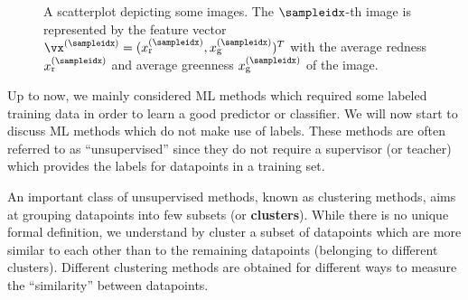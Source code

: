 \documentclass[12pt]{report}
\begin{document}
\begin{figure}[htbp]
\begin{center}
\end{center}
\caption{A scatterplot depicting some images. The $\sampleidx$-th image is 
	represented by the feature vector $\vx^{(\sampleidx)}=(x^{(\sampleidx)}_{\rm r},x^{(\sampleidx)}_{\rm g})^{T}$ 
	with the average redness $x_{\rm r}^{(\sampleidx)}$ and average greenness $x_{\rm g}^{(\sampleidx)}$ of the image. 
} 
\label{fig_scatterplot_clustering}
\end{figure}

Up to now, we mainly considered ML methods which required 
some labeled training data in order to learn a good predictor or 
classifier. We will now start to discuss ML methods which do 
not make use of labels. These methods are often referred to as 
``unsupervised'' since they do not require a supervisor 
(or teacher) which provides the labels for datapoints in a training set. 

An important class of unsupervised methods, known as clustering 
methods, aims at grouping datapoints into few subsets (or {\bf clusters}). 
While there is no unique formal definition, we understand by cluster 
a subset of datapoints which are more similar to each other than 
to the remaining datapoints (belonging to different clusters). Different 
clustering methods are obtained for different ways to measure the 
``similarity'' between datapoints. 
\end{document}
